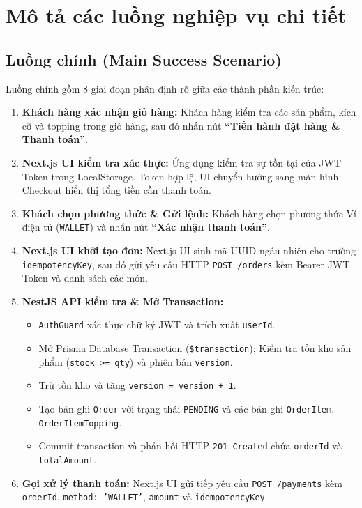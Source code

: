 \documentclass[12pt,a4paper]{article}
\begin{document}
\section{Mô tả các luồng nghiệp vụ chi tiết}

\subsection{Luồng chính (Main Success Scenario)}
Luồng chính gồm 8 giai đoạn phân định rõ giữa các thành phần kiến trúc:

\begin{enumerate}[leftmargin=*,itemsep=4pt]
    \item \textbf{Khách hàng xác nhận giỏ hàng:} Khách hàng kiểm tra các sản phẩm, kích cỡ và topping trong giỏ hàng, sau đó nhấn nút \textbf{``Tiến hành đặt hàng \& Thanh toán''}.
    \item \textbf{Next.js UI kiểm tra xác thực:} Ứng dụng kiểm tra sự tồn tại của JWT Token trong LocalStorage. Token hợp lệ, UI chuyển hướng sang màn hình Checkout hiển thị tổng tiền cần thanh toán.
    \item \textbf{Khách chọn phương thức \& Gửi lệnh:} Khách hàng chọn phương thức Ví điện tử (\texttt{WALLET}) và nhấn nút \textbf{``Xác nhận thanh toán''}.
    \item \textbf{Next.js UI khởi tạo đơn:} Next.js UI sinh mã UUID ngẫu nhiên cho trường \texttt{idempotencyKey}, sau đó gửi yêu cầu HTTP \texttt{POST /orders} kèm Bearer JWT Token và danh sách các món.
    \item \textbf{NestJS API kiểm tra \& Mở Transaction:} 
    \begin{itemize}[itemsep=1pt]
        \item \texttt{AuthGuard} xác thực chữ ký JWT và trích xuất \texttt{userId}.
        \item Mở Prisma Database Transaction (\texttt{\$transaction}): Kiểm tra tồn kho sản phẩm (\texttt{stock >= qty}) và phiên bản \texttt{version}.
        \item Trừ tồn kho và tăng \texttt{version = version + 1}.
        \item Tạo bản ghi \texttt{Order} với trạng thái \texttt{PENDING} và các bản ghi \texttt{OrderItem}, \texttt{OrderItemTopping}.
        \item Commit transaction và phản hồi HTTP \texttt{201 Created} chứa \texttt{orderId} và \texttt{totalAmount}.
    \end{itemize}
    \item \textbf{Gọi xử lý thanh toán:} Next.js UI gửi tiếp yêu cầu \texttt{POST /payments} kèm \texttt{orderId}, \texttt{method: 'WALLET'}, \texttt{amount} và \texttt{idempotencyKey}.

\end{enumerate}
\end{document}
